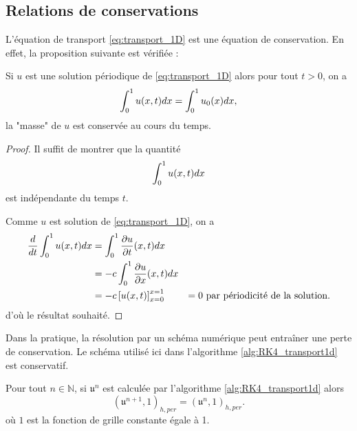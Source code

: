 \subsection{Relations de conservations}

L'équation de transport \eqref{eq:transport_1D} est une équation de conservation. En effet, la proposition suivante est vérifiée :

\begin{proposition}
Si $u$ est une solution périodique de \eqref{eq:transport_1D} alors pour tout $t>0$, on a
\begin{equation}
\displaystyle\int_0^1 u(x,t)dx = \displaystyle\int_0^1 u_0(x)dx,
\end{equation}
la "masse" de $u$ est conservée au cours du temps.
\end{proposition}

\begin{proof}
Il suffit de montrer que la quantité
\begin{equation}
\displaystyle\int_0^1 u(x,t)dx
\end{equation}
est indépendante du temps $t$.

Comme $u$ est solution de \eqref{eq:transport_1D}, on a
\begin{align*}
\dfrac{d}{dt} \displaystyle\int_0^1 u(x,t) dx & = \displaystyle\int_0^1 \dfrac{\partial u}{\partial t}(x,t) dx \\
	& = - c \displaystyle\int_0^1 \dfrac{\partial u}{\partial x} (x,t) dx \\
	& = - c \left[ u(x,t) \right]_{x=0}^{x=1}
	& = 0 \text{ par périodicité de la solution.}
\end{align*}
d'où le résultat souhaité.
\end{proof}

Dans la pratique, la résolution par un schéma numérique peut entraîner une perte de conservation. 
Le schéma utilisé ici dans l'algorithme \ref{alg:RK4_transport1d} est conservatif.

\begin{proposition}
Pour tout $n \in \mathbb{N}$, si $\mathfrak{u}^n$ est calculée par l'algorithme \ref{alg:RK4_transport1d} alors
\begin{equation}
(\mathfrak{u}^{n+1}, \mathfrak{1})_{h,per} = (\mathfrak{u}^n, \mathfrak{1})_{h,per}.
\end{equation}
où $\mathfrak{1}$ est la fonction de grille constante égale à 1.
\end{proposition}

